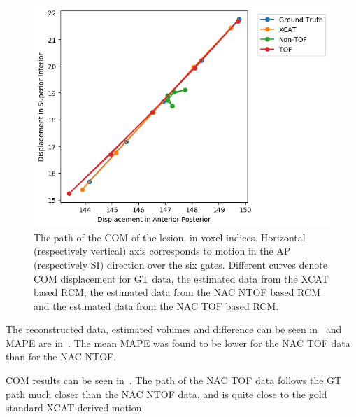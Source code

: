             \begin{figure}
                \centering
                
                \includegraphics[width=1.0\linewidth]{figures/motion_correction_results_1_TOF.png}
                
                \captionsetup{singlelinecheck=false, justification=raggedright}
                \caption{The path of the \gls{COM} of the lesion, in voxel indices. Horizontal (respectively vertical) axis corresponds to motion in the \gls{AP} (respectively \gls{SI}) direction over the six gates. Different curves denote \gls{COM} displacement for \gls{GT} data, the estimated data from the \gls{XCAT} based \gls{RCM}, the estimated data from the \gls{NAC} \gls{NTOF} based \gls{RCM} and the estimated data from the \gls{NAC} \gls{TOF} based \gls{RCM}.} \label{fig:impact_of_tof_on_respiratory_motion_model_estimation_using_pre_gated_no_intra_cycle_motion_nac_pet_results_com_graph}
            \end{figure}
            
             The reconstructed data, estimated volumes and difference can be seen in~ and \gls{MAPE} are in~. The mean \gls{MAPE} was found to be lower for the \gls{NAC} \gls{TOF} data than for the \gls{NAC} \gls{NTOF}.
            
             \gls{COM} results can be seen in~. The path of the \gls{NAC} \gls{TOF} data follows the \gls{GT} path much closer than the \gls{NAC} \gls{NTOF} data, and is quite close to the gold standard \gls{XCAT}-derived motion.
            
